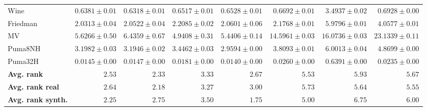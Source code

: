 \begin{table*}[!htbp]
{\begin{tabular}{lrrrrrrr}
		Wine & $0.6381 \pm 0.01$ & $\mathbf{0.6318 \pm 0.01}$ & $0.6517 \pm 0.01$ & $0.6528 \pm 0.01$ & $0.6692 \pm 0.01$ & $3.4937 \pm 0.02$ & $0.6928 \pm 0.00$\\
		Friedman & $\mathbf{2.0313 \pm 0.04}$ & $2.0522 \pm 0.04$ & $2.2085 \pm 0.02$ & $2.0601 \pm 0.06$ & $2.1768 \pm 0.01$ & $5.9796 \pm 0.01$ & $4.0577 \pm 0.01$\\
		MV & $5.6266 \pm 0.50$ & $6.4359 \pm 0.67$ & $\mathbf{4.9408 \pm 0.31}$ & $5.4406 \pm 0.14$ & $14.5961 \pm 0.03$ & $16.0736 \pm 0.03$ & $23.1339 \pm 0.11$\\
		Puma8NH & $3.1982 \pm 0.03$ & $3.1946 \pm 0.02$ & $3.4462 \pm 0.03$ & $\mathbf{2.9594 \pm 0.00}$ & $3.8093 \pm 0.01$ & $6.0013 \pm 0.04$ & $4.8699 \pm 0.00$\\
		Puma32H & $0.0145 \pm 0.00$ & $0.0147 \pm 0.00$ & $0.0181 \pm 0.00$ & $\mathbf{0.0140 \pm 0.00}$ & $0.0260 \pm 0.00$ & $0.6391 \pm 0.00$ & $0.0235 \pm 0.00$\\
		\midrule
		\textbf{{Avg. rank}} & $2.53$ & $\mathbf{2.33}$ & $3.33$ & $2.67$ & $5.53$ & $5.93$ & $5.67$\\
		\textbf{{Avg. rank real}} & $2.64$ & $\mathbf{2.18}$ & $3.27$ & $3.00$ & $5.73$ & $5.64$ & $5.55$\\
		\textbf{{Avg. rank synth.}} & $2.25$ & $2.75$ & $3.50$ & $\mathbf{1.75}$ & $5.00$ & $6.75$ & $6.00$\\
		\bottomrule
	\end{tabular}}
\end{table*}
